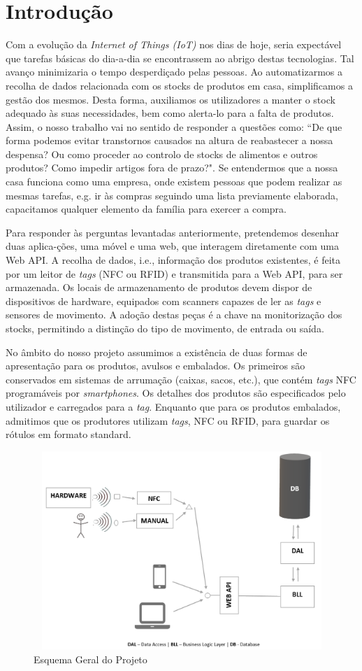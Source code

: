 %
%
\section*{Introdução} \label{Introducao}

Com a evolução da \textit{Internet of Things (IoT)} nos dias de hoje, seria expectável que tarefas básicas do dia-a-dia se encontrassem ao abrigo destas tecnologias. Tal avanço minimizaria o tempo desperdiçado pelas pessoas. Ao automatizarmos a recolha de dados relacionada com os stocks de produtos em casa, simplificamos a gestão dos mesmos. Desta forma, auxiliamos os utilizadores a manter o stock adequado às suas necessidades, bem como alerta-lo para a falta de produtos. Assim, o nosso trabalho vai no sentido de responder a questões como: ``De que forma podemos evitar transtornos causados na altura de reabastecer a nossa despensa? Ou como proceder ao controlo de stocks de alimentos e outros produtos? Como impedir artigos fora de prazo?". Se entendermos que a nossa casa funciona como uma empresa, onde existem pessoas que podem realizar as mesmas tarefas, e.g. ir às compras seguindo uma lista previamente elaborada, capacitamos qualquer elemento da família para exercer a compra.

Para responder às perguntas levantadas anteriormente, pretendemos desenhar duas aplica-ções, uma móvel e uma web, que interagem diretamente com uma Web API. A recolha de dados, i.e., informação dos produtos existentes, é feita por um leitor de \textit{tags} (NFC ou RFID) e transmitida para a Web API, para ser armazenada. Os locais de armazenamento de produtos devem dispor de dispositivos de hardware, equipados com scanners capazes de ler as \textit{tags} e sensores de movimento. A adoção destas peças é a chave na monitorização dos stocks, permitindo a distinção do tipo de movimento, de entrada ou saída.

No âmbito do nosso projeto assumimos a existência de duas formas de apresentação para os produtos, avulsos e embalados. Os primeiros são conservados em sistemas de arrumação (caixas, sacos, etc.), que contém \textit{tags} NFC programáveis por \textit{smartphones}. Os detalhes dos produtos são especificados pelo utilizador e carregados para a \textit{tag}. Enquanto que para os produtos embalados, admitimos que os produtores utilizam \textit{tags}, NFC ou RFID, para guardar os rótulos em formato standard.

\vspace{-15mm}
\hspace{2mm}

\begin{figure}[h!]
	\includegraphics[width=14cm,height=7.5cm,scale=0.5]{./figures/Esquema_Estrutura_Projeto_Geral.png}
	\caption{Esquema Geral do Projeto}
	\label{esquema_geral}
\end{figure}